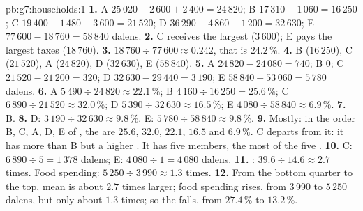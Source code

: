 \begin{solution}{pb:g7:households:1}
\textbf{1.} A $25\,020 - 2\,600 + 2\,400 = 24\,820$; B $17\,310 - 1\,060 = 16\,250$; C $19\,400 -
1\,480 + 3\,600 = 21\,520$; D $36\,290 - 4\,860 + 1\,200 = 32\,630$; E $77\,600 - 18\,760 = 58\,840$
dalens.
\textbf{2.} C receives the largest  ($3\,600$); E pays the largest taxes ($18\,760$).
\textbf{3.} $18\,760 \div 77\,600 \approx 0.242$, that is $24.2\,\%$.
\textbf{4.} B ($16\,250$), C ($21\,520$), A ($24\,820$), D ($32\,630$), E ($58\,840$).
\textbf{5.} A $24\,820 - 24\,080 = 740$; B $0$; C $21\,520 - 21\,200 = 320$; D $32\,630 - 29\,440 =
3\,190$; E $58\,840 - 53\,060 = 5\,780$ dalens.
\textbf{6.} A $5\,490 \div 24\,820 \approx 22.1\,\%$; B $4\,160 \div 16\,250 = 25.6\,\%$; C $6\,890
\div 21\,520 \approx 32.0\,\%$; D $5\,390 \div 32\,630 \approx 16.5\,\%$; E $4\,080 \div 58\,840
\approx 6.9\,\%$.
\textbf{7.} B.
\textbf{8.} D: $3\,190 \div 32\,630 \approx 9.8\,\%$. E: $5\,780 \div 58\,840 \approx 9.8\,\%$.
\textbf{9.} Mostly: in the order B, C, A, D, E of , the  are $25.6$,
$32.0$, $22.1$, $16.5$ and $6.9\,\%$. C departs from it: it has more  than B but a higher . It has five members, the most of the five .
\textbf{10.} C: $6\,890 \div 5 = 1\,378$ dalens; E: $4\,080 \div 1 = 4\,080$ dalens.
\textbf{11.} : $39.6 \div 14.6 \approx 2.7$ times. Food spending: $5\,250 \div 3\,990 \approx
1.3$ times.
\textbf{12.} From the bottom quarter to the top, mean  is about $2.7$ times
larger; food spending rises, from $3\,990$ to $5\,250$ dalens, but only about $1.3$ times; so the
 falls, from $27.4\,\%$ to $13.2\,\%$.
\end{solution}
